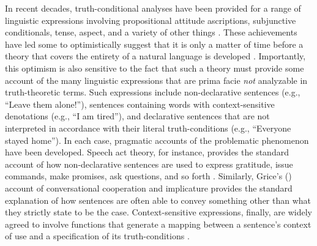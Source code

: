 In recent decades, truth-conditional analyses have been provided for a range of linguistic expressions involving propositional attitude ascriptions, subjunctive conditionals, tense, aspect, and a variety of other things \citep{Carpenter:1997,Soames:2010,Stanley:2008,Speaks:2014}. These achievements have led some to optimistically suggest that it is only a matter of time before a theory that covers the entirety of a natural language is developed \citep[e.g.,][]{Soames:2010}. Importantly, this optimism is also sensitive to the fact that such a theory must provide some account of the many linguistic expressions that are prima facie \textit{not} analyzable in truth-theoretic terms. Such expressions include non-declarative sentences (e.g., ``Leave them alone!''), sentences containing words with context-sensitive denotations (e.g., ``I am tired''), and declarative sentences that are not interpreted in accordance with their literal truth-conditions (e.g., ``Everyone stayed home''). In each case, pragmatic accounts of the problematic phenomenon have been developed. Speech act theory, for instance, provides the standard account of how non-declarative sentences are used to express gratitude, issue commands, make promises, ask questions, and so forth \citep{Austin:1962,Searle:1969}. Similarly, Grice's (\citeyear{Grice:1975}) account of conversational cooperation and implicature provides the standard explanation of how sentences are often able to convey something other than what they strictly state to be the case. Context-sensitive expressions, finally, are widely agreed to involve functions that generate a mapping between a sentence's context of use and a specification of its truth-conditions \citep{Soames:2010,Recanati:2012,Recanati:2004,CappelenLepore:2005}. 


